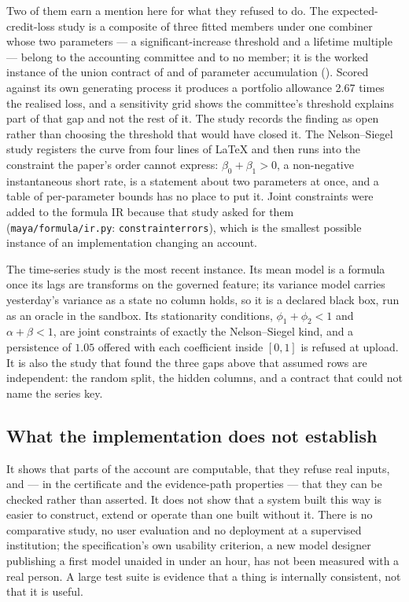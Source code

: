 \documentclass[11pt,a4paper]{article}
\renewcommand{\_}{\oldunderscore\allowbreak}
\theoremstyle{plain}
\theoremstyle{definition}
\theoremstyle{definition}
\theoremstyle{remark}
\begin{document}
Two of them earn a mention here for what they refused to do. The expected-credit-loss study is a
composite of three fitted members under one combiner whose two parameters --- a significant-increase
threshold and a lifetime multiple --- belong to the accounting committee and to no member; it is the
worked instance of the union contract of  and of parameter accumulation
(). Scored against its own generating process it produces a portfolio allowance 2.67
times the realised loss, and a sensitivity grid shows the committee's threshold explains part of that gap
and not the rest of it. The study records the finding as open rather than choosing the threshold that
would have closed it. The Nelson--Siegel study registers the curve from four lines of LaTeX and then runs
into the constraint the paper's order cannot express: $\beta_0 + \beta_1 > 0$, a non-negative
instantaneous short rate, is a statement about two parameters at once, and a table of per-parameter
bounds has no place to put it. Joint constraints were added to the formula IR because that study asked
for them (\texttt{maya/formula/ir.py}: \texttt{constraint\_errors}), which is the smallest possible
instance of an implementation changing an account.

The time-series study is the most recent instance. Its mean model is a formula once its lags are transforms on
the governed feature; its variance model carries yesterday's variance as a state no column holds, so it is a
declared black box, run as an oracle in the sandbox. Its stationarity conditions, $\phi_1 + \phi_2 < 1$ and
$\alpha + \beta < 1$, are joint constraints of exactly the Nelson--Siegel kind, and a persistence of $1.05$
offered with each coefficient inside $[0, 1]$ is refused at upload. It is also the study that found the three
gaps above that assumed rows are independent: the random split, the hidden columns, and a contract that could
not name the series key.

\subsection{What the implementation does not establish}

It shows that parts of the account are computable, that they refuse real inputs, and --- in the
certificate and the evidence-path properties --- that they can be checked rather than asserted. It does
not show that a system built this way is easier to construct, extend or operate than one built without
it. There is no comparative study, no user evaluation and no deployment at a supervised institution; the
specification's own usability criterion, a new model designer publishing a first model unaided in under
an hour, has not been measured with a real person. A large test suite is evidence that a thing is
internally consistent, not that it is useful.
\end{document}
